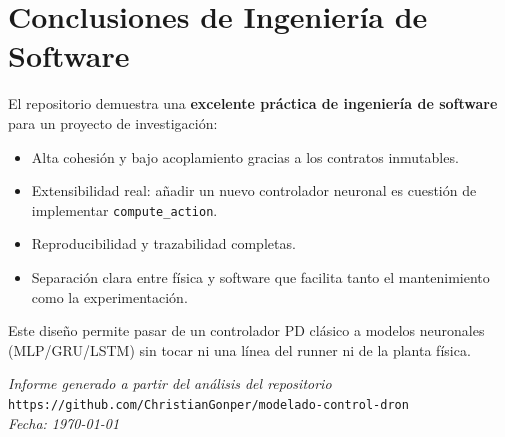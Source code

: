 \documentclass[12pt,a4paper]{article}
\begin{document}
\section{Conclusiones de Ingeniería de Software}

El repositorio demuestra una \textbf{excelente práctica de ingeniería de software} para un proyecto de investigación:

\begin{itemize}
    \item Alta cohesión y bajo acoplamiento gracias a los contratos inmutables.
    \item Extensibilidad real: añadir un nuevo controlador neuronal es cuestión de implementar \texttt{compute\_action}.
    \item Reproducibilidad y trazabilidad completas.
    \item Separación clara entre física y software que facilita tanto el mantenimiento como la experimentación.
\end{itemize}

Este diseño permite pasar de un controlador PD clásico a modelos neuronales (MLP/GRU/LSTM) sin tocar ni una línea del runner ni de la planta física.

\vspace{1cm}
\begin{center}
\textit{Informe generado a partir del análisis del repositorio}\\
\texttt{https://github.com/ChristianGonper/modelado-control-dron}\\
\textit{Fecha: \today}
\end{center}
\end{document}
